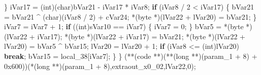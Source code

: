 \documentclass[
]{article}
\newenvironment{Shaded}{}{}
\newcommand{\BaseNTok}[1]{\textcolor[rgb]{0.25,0.63,0.44}{#1}}
\newcommand{\ControlFlowTok}[1]{\textcolor[rgb]{0.00,0.44,0.13}{\textbf{#1}}}
\newcommand{\DataTypeTok}[1]{\textcolor[rgb]{0.56,0.13,0.00}{#1}}
\newcommand{\DecValTok}[1]{\textcolor[rgb]{0.25,0.63,0.44}{#1}}
\newcommand{\NormalTok}[1]{#1}
\newcommand{\OperatorTok}[1]{\textcolor[rgb]{0.40,0.40,0.40}{#1}}
\begin{document}
\begin{Shaded}
\begin{Highlighting}[]
      \OperatorTok{\}}
\NormalTok{      iVar17 }\OperatorTok{=} \OperatorTok{(}\DataTypeTok{int}\OperatorTok{)(}\DataTypeTok{char}\OperatorTok{)}\NormalTok{bVar21 }\OperatorTok{{-}}\NormalTok{ iVar17 }\OperatorTok{*}\NormalTok{ iVar8}\OperatorTok{;}
      \ControlFlowTok{if} \OperatorTok{(}\NormalTok{iVar8 }\OperatorTok{/} \DecValTok{2} \OperatorTok{\textless{}}\NormalTok{ iVar17}\OperatorTok{)} \OperatorTok{\{}
\NormalTok{        bVar21 }\OperatorTok{=}\NormalTok{ bVar21 }\OperatorTok{\^{}} \OperatorTok{(}\DataTypeTok{char}\OperatorTok{)(}\NormalTok{iVar8 }\OperatorTok{/} \DecValTok{2}\OperatorTok{)} \OperatorTok{+}\NormalTok{ cVar24}\OperatorTok{;}
        \OperatorTok{*(}\NormalTok{byte }\OperatorTok{*)(}\NormalTok{lVar22 }\OperatorTok{+}\NormalTok{ lVar20}\OperatorTok{)} \OperatorTok{=}\NormalTok{ bVar21}\OperatorTok{;}
      \OperatorTok{\}}
\NormalTok{      iVar7 }\OperatorTok{=}\NormalTok{ iVar7 }\OperatorTok{+} \DecValTok{1}\OperatorTok{;}
      \ControlFlowTok{if} \OperatorTok{((}\DataTypeTok{int}\OperatorTok{)}\NormalTok{sVar10 }\OperatorTok{==}\NormalTok{ iVar7}\OperatorTok{)} \OperatorTok{\{}
\NormalTok{        iVar7 }\OperatorTok{=} \DecValTok{0}\OperatorTok{;}
      \OperatorTok{\}}
\NormalTok{      bVar5 }\OperatorTok{=} \OperatorTok{*(}\NormalTok{byte }\OperatorTok{*)(}\NormalTok{lVar22 }\OperatorTok{+}\NormalTok{ iVar17}\OperatorTok{);}
      \OperatorTok{*(}\NormalTok{byte }\OperatorTok{*)(}\NormalTok{lVar22 }\OperatorTok{+}\NormalTok{ iVar17}\OperatorTok{)} \OperatorTok{=}\NormalTok{ bVar21}\OperatorTok{;}
      \OperatorTok{*(}\NormalTok{byte }\OperatorTok{*)(}\NormalTok{lVar22 }\OperatorTok{+}\NormalTok{ lVar20}\OperatorTok{)} \OperatorTok{=}\NormalTok{ bVar5 }\OperatorTok{\^{}}\NormalTok{ bVar15}\OperatorTok{;}
\NormalTok{      lVar20 }\OperatorTok{=}\NormalTok{ lVar20 }\OperatorTok{+} \DecValTok{1}\OperatorTok{;}
      \ControlFlowTok{if} \OperatorTok{(}\NormalTok{iVar8 }\OperatorTok{\textless{}=} \OperatorTok{(}\DataTypeTok{int}\OperatorTok{)}\NormalTok{lVar20}\OperatorTok{)} \ControlFlowTok{break}\OperatorTok{;}
\NormalTok{      bVar15 }\OperatorTok{=}\NormalTok{ local\_38}\OperatorTok{[}\NormalTok{iVar7}\OperatorTok{];}
    \OperatorTok{\}}
  \OperatorTok{\}}
  \OperatorTok{(**(}\NormalTok{code }\OperatorTok{**)(**(}\DataTypeTok{long} \OperatorTok{**)(}\NormalTok{param\_1 }\OperatorTok{+} \DecValTok{8}\OperatorTok{)} \OperatorTok{+} \BaseNTok{0x600}\OperatorTok{))(*(}\DataTypeTok{long} \OperatorTok{**)(}\NormalTok{param\_1 }\OperatorTok{+} \DecValTok{8}\OperatorTok{),}\NormalTok{extraout\_x0\_02}\OperatorTok{,}\NormalTok{lVar22}\OperatorTok{,}\DecValTok{0}\OperatorTok{);}

\end{Highlighting}
\end{Shaded}
\end{document}
